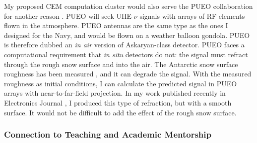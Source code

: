 \documentclass[../../../main.tex]{subfiles}
\begin{document}
My proposed CEM computation cluster would also serve the PUEO collaboration for another reason \cite{pueo}.  PUEO will seek UHE-$\nu$ signals with arrays of RF elements flown in the atmosphere.  PUEO antennas are the same type as the ones I designed for the Navy, and would be flown on a weather balloon gondola.  PUEO is therefore dubbed an \textit{in air} version of Askaryan-class detector.  PUEO faces a computational requirement that \textit{in situ} detectors do not: the signal must refract through the rough snow surface and into the air.  The Antarctic snow surface roughness has been measured \cite{doi:10.1142/S2251171717400025}, and it can degrade the signal.  With the measured roughness as initial conditions, I can calculate the predicted signal in PUEO arrays with near-to-far-field projection.  In my work published recently in Electronics Journal \cite{electronics10040415}, I produced this type of refraction, but with a smooth surface.  It would not be difficult to add the effect of the rough snow surface.

\subsubsection{Connection to Teaching and Academic Mentorship}
\end{document}
